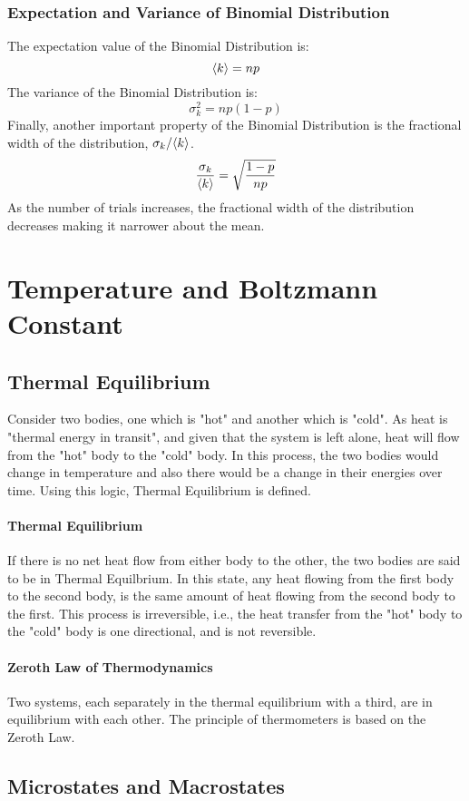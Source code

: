 \documentclass[12pt, oneside]{book}
\DeclarePairedDelimiter{\evdel}{\langle}{\rangle}
\newcommand{\ev}{\evdel}
\begin{document}
\subsubsection{Expectation and Variance of Binomial Distribution}
The expectation value of the Binomial Distribution is:
\[ \ev{k} = np \]
The variance of the Binomial Distribution is:
\[ \sigma_k^2 = np\left(1-p\right) \]
Finally, another important property of the Binomial Distribution is the fractional width of the distribution, \(\sigma_k/\ev{k}\).
\[ \frac{\sigma_k}{\ev{k}} = \sqrt{ \frac{1-p}{np} } \]
As the number of trials increases, the fractional width of the distribution decreases making it narrower about the mean.

\section{Temperature and Boltzmann Constant}
\subsection{Thermal Equilibrium}
Consider two bodies, one which is "hot" and another which is "cold".
As heat is "thermal energy in transit", and given that the system is left alone, heat will flow from the "hot" body to the "cold" body.
In this process, the two bodies would change in temperature and also there would be a change in their energies over time.
Using this logic, Thermal Equilibrium is defined.
\paragraph{Thermal Equilibrium} If there is no net heat flow from either body to the other, the two bodies are said to be in Thermal Equilbrium.
In this state, any heat flowing from the first body to the second body, is the same amount of heat flowing from the second body to the first.
This process is irreversible, i.e., the heat transfer from the "hot" body to the "cold" body is one directional, and is not reversible.
\paragraph{Zeroth Law of Thermodynamics} Two systems, each separately in the thermal equilibrium with a third, are in equilibrium with each other.
The principle of thermometers is based on the Zeroth Law.

\subsection{Microstates and Macrostates}
\end{document}
